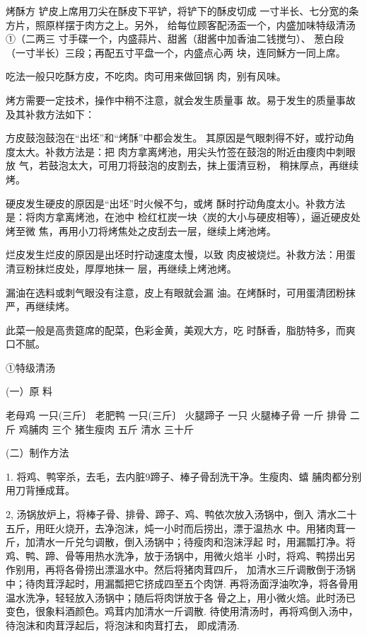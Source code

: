 \begin{recipe}{烤酥方}
\step 铲皮上席用刀尖在酥皮下平铲，将铲下的酥皮切成
一寸半长、七分宽的条方片，照原样摆于肉方之上。另外，
给每位顾客配汤盃一个，内盛加味特级清汤①（二两三
寸手碟一个，内盛蒜片、甜酱（甜酱中加香油二钱搅匀）、
葱白段（一寸半长）三段；再配五寸平盘一个，内盛点心两 块，连同穌方一同上席。

\step 吃法一般只吃酥方皮，不吃肉。肉可用来做回锅 肉，别有风味。

\notice

烤方需要一定技术，操作中稍不注意，就会发生质量事
故。易于发生的质量事故及其补救方法如下：

\step 方皮鼓泡鼓泡在“出坯”和“烤酥”中都会发生。
其原因是气眼刺得不好，或拧动角度太大。补救方法是：把
肉方拿离烤池，用尖头竹签在鼓泡的附近由痩肉中刺眼放
气，若鼓泡太大，可用刀将鼓泡的皮割去，抹上蛋清豆粉， 稍抹厚点，再继续烤。

\step 硬皮发生硬皮的原因是“出坯”时火候不匀，或烤
酥时拧动角度太小。补救方法是：将肉方拿离烤池，在池中
检红杠炭一块〈炭的大小与硬皮相等），逼近硬皮处烤至微
焦，再用小刀将烤焦处之皮刮去一层，继续上烤池烤。

\step 烂皮发生烂皮的原因是出坯时拧动速度太慢，以致
肉皮被烧烂。补救方法：用蛋清豆粉抹烂皮处，厚厚地抹一 层，再继续上烤池烤。

\step 漏油在选料或刺气眼没有注意，皮上有眼就会漏
油。在烤酥时，可用蛋清团粉抹严，再继续烤。

\notes

此菜一般是高贵筵席的配菜，色彩金黄，美观大方，吃
时酥香，脂肪特多，而爽口不腻。

①特级清汤

(一）原 料

老母鸡	一只(三斤〕	老肥鸭	一只(三斤〕
火腿蹄子	一只	火腿棒子骨	一斤
排骨	二斤	鸡脯肉	三个
猪生瘦肉	五斤	清水	三十斤

(二）制作方法

1.	将鸡、鸭宰杀，去毛，去内脏9蹄子、棒子骨刮洗干净。生瘦肉、蟢 脯肉都分别用刀背捶成茸。

2,	汤锅放炉上，将棒子骨、排骨、蹄子、鸡、鸭依次放入汤锅中，倒入 清水二十五斤，用旺火烧开，去净泡沫，炖一小时而后捞出，漂于温热水 中。用猪肉茸一斤，加清水一斤兑匀调散，倒入汤锅中；待瘦肉和泡沫浮起 时，用漏瓢打净。将鸡、鸭、蹄、骨等用热水洗净，放于汤锅中，用微火焙半 小时，将鸡、鸭捞出另作别用，再将各骨捞出漂溫水中。然后将猪肉茸四斤， 加清水三斤调散倒于汤锅中；待肉茸浮起时，用漏瓢把它挤成四至五个肉饼. 再将汤面浮油吹净，将各骨用温水洗净，轻轻放入汤锅中；随后将肉饼放于各 骨之上，用小微火焙。此时汤已变色，很象料酒颜色。鸡茸内加清水一斤调散. 待使用清汤时，再将鸡倒入汤中，待泡沫和肉茸浮起后，将泡沫和肉茸打去， 即成清汤.

\end{recipe}

